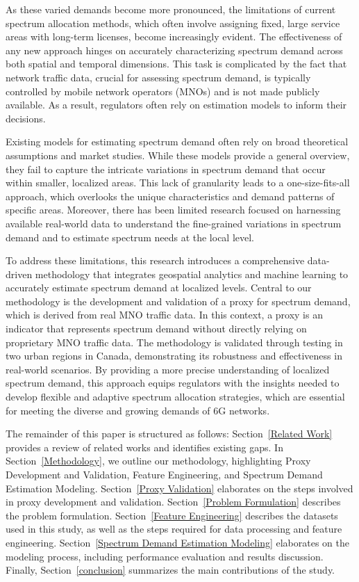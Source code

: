 \documentclass[conference]{IEEEtran}
\begin{document}
As these varied demands become more pronounced, the limitations of current spectrum allocation methods, which often involve assigning fixed, large service areas with long-term licenses, become increasingly evident. The effectiveness of any new approach hinges on accurately characterizing spectrum demand across both spatial and temporal dimensions. This task is complicated by the fact that network traffic data, crucial for assessing spectrum demand, is typically controlled by mobile network operators (MNOs) and is not made publicly available. As a result, regulators often rely on estimation models to inform their decisions.

Existing models for estimating spectrum demand often rely on broad theoretical assumptions and market studies. While these models provide a general overview, they fail to capture the intricate variations in spectrum demand that occur within smaller, localized areas. This lack of granularity leads to a one-size-fits-all approach, which overlooks the unique characteristics and demand patterns of specific areas. Moreover, there has been limited research focused on harnessing available real-world data to understand the fine-grained variations in spectrum demand and to estimate spectrum needs at the local level.

To address these limitations, this research introduces a comprehensive data-driven methodology that integrates geospatial analytics and machine learning to accurately estimate spectrum demand at localized levels. Central to our methodology is the development and validation of a proxy for spectrum demand, which is derived from real MNO traffic data. In this context, a proxy is an indicator that represents spectrum demand without directly relying on proprietary MNO traffic data. The methodology is validated through testing in two urban regions in Canada, demonstrating its robustness and effectiveness in real-world scenarios. By providing a more precise understanding of localized spectrum demand, this approach equips regulators with the insights needed to develop flexible and adaptive spectrum allocation strategies, which are essential for meeting the diverse and growing demands of 6G networks.

The remainder of this paper is structured as follows: Section~\ref{Related Work} provides a review of related works and identifies existing gaps. In Section~\ref{Methodology}, we outline our methodology, highlighting Proxy Development and Validation, Feature Engineering, and Spectrum Demand Estimation Modeling. Section~\ref{Proxy Validation} elaborates on the steps involved in proxy development and validation. Section~\ref{Problem Formulation} describes the problem formulation. Section~\ref{Feature Engineering} describes the datasets used in this study, as well as the steps required for data processing and feature engineering. Section~\ref{Spectrum Demand Estimation Modeling} elaborates on the modeling process, including performance evaluation and results discussion. Finally, Section~\ref{conclusion} summarizes the main contributions of the study.
\end{document}
